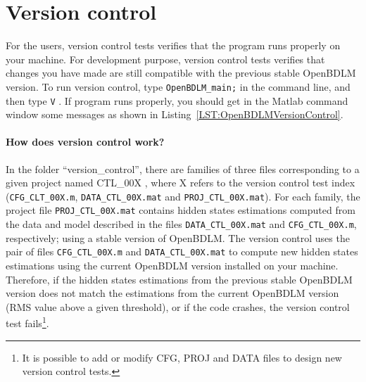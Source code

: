 \section{Version control}
\label{S:VERSIONCONTROL}

For the users, version control tests verifies that the program runs properly on your machine. 
For development purpose, version control tests verifies that changes you have made are still compatible with the previous stable OpenBDLM version. 
To run version control, type \colorbox{light-gray}{\lstinline[basicstyle = \mlttfamily \small, backgroundcolor = \color{light-gray}]!OpenBDLM_main;! } in the \MATLAB{} command line, and then type \colorbox{light-gray}{\lstinline[basicstyle = \mlttfamily \small, backgroundcolor = \color{light-gray}]!V! }. 
If program runs properly, you should get in the Matlab command window some messages as shown in Listing~\ref{LST:OpenBDLMVersionControl}.

\paragraph{How does version control work?}
In the folder ``version\_control'', there are families of three files corresponding to a given project named CTL\_00X , where X refers to the version control test index (\lstinline[basicstyle = \mlttfamily \small, backgroundcolor = \color{light-gray}]!CFG_CLT_00X.m!, \lstinline[basicstyle = \mlttfamily \small, backgroundcolor = \color{light-gray}]!DATA_CTL_00X.mat! and \lstinline[basicstyle = \mlttfamily \small, backgroundcolor = \color{light-gray}]!PROJ_CTL_00X.mat!).
For each family, the project file \lstinline[basicstyle = \mlttfamily \small, backgroundcolor = \color{light-gray}]!PROJ_CTL_00X.mat! contains hidden states estimations computed from the data and model described in the files \lstinline[basicstyle = \mlttfamily \small, backgroundcolor = \color{light-gray}]!DATA_CTL_00X.mat! and \lstinline[basicstyle = \mlttfamily \small, backgroundcolor = \color{light-gray}]!CFG_CTL_00X.m!, respectively; using a stable version of OpenBDLM.
The version control uses the pair of files \lstinline[basicstyle = \mlttfamily \small, backgroundcolor = \color{light-gray}]!CFG_CTL_00X.m! and \lstinline[basicstyle = \mlttfamily \small, backgroundcolor = \color{light-gray}]!DATA_CTL_00X.mat! to compute new hidden states estimations using the current  OpenBDLM version installed on your machine.
Therefore, if the hidden states estimations from the previous stable OpenBDLM version does not match the estimations from the current OpenBDLM version (RMS value above a given threshold), or if the code crashes, the version control test fails\footnote{It is possible to add or modify CFG, PROJ and DATA files to design new version control tests.}.

